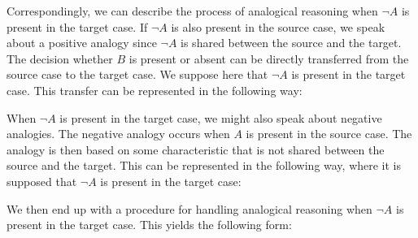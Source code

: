		Correspondingly, we can describe the process of analogical reasoning when $\neg A$ is present in the target case. If $\neg A$ is also present in the source case, we speak about a positive analogy since $\neg A$ is shared between the source and the target. The decision whether $B$ is present or absent can be directly transferred from the source case to the target case. We suppose here that $\neg A$ is present in the target case. This transfer can be represented in the following way: \medskip
			
			\noindent\begin{minipage}{0.9\textwidth}
			\end{minipage}	\medskip			
		
		When $\neg A$ is present in the target case, we might also speak about negative analogies. The negative analogy occurs when $A$ is present in the source case. The analogy is then based on some characteristic that is not shared between the source and the target. This can be represented in the following way, where it is supposed that $\neg A$ is present in the target case: \medskip
			
			\noindent\begin{minipage}{0.9\textwidth}
			\end{minipage}\medskip
		
		We then end up with a procedure for handling analogical reasoning when $\neg A$ is present in the target case. This yields the following form: \medskip
			
			\noindent\begin{minipage}{0.9\textwidth}
			\end{minipage}\medskip				
		
